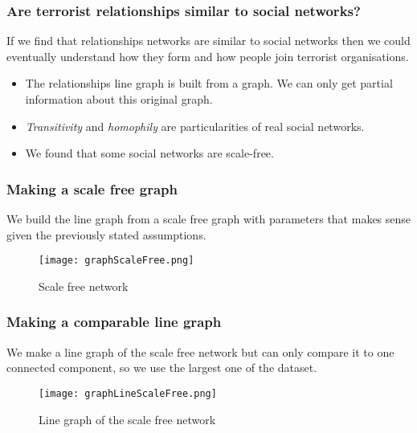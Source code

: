 \begin{frame}
\frametitle{Are terrorist relationships similar to social networks?}
If we find that relationships networks are similar to social networks then we could eventually understand how they form and how people join terrorist organisations.

\begin{itemize}
\item The relationships line graph is built from a graph. We can only get partial information about this original graph.
\item \emph{Transitivity} and \emph{homophily} are particularities of real social networks.
\item We found that some social networks are scale-free. 
\end{itemize}

\end{frame}


\begin{frame}
\frametitle{Making a scale free graph}

We build the line graph from a scale free graph with parameters that makes sense given the previously stated assumptions.

\begin{figure}[H]
\begin{center}
        \texttt{[image: graphScaleFree.png]}
        \caption{Scale free network}
        \label{fig:Scalefree}
        \end{center}
\end{figure}
\end{frame}
    

\begin{frame}
\frametitle{Making a comparable line graph}
We make a line graph of the scale free network but can only compare it to one connected component, so we use the largest one of the dataset.

\begin{figure}[H]
\begin{center}
    \texttt{[image: graphLineScaleFree.png]}
    \caption{Line graph of the scale free network}
    \label{fig:lineG}
\end{center}
\end{figure}
\end{frame}

